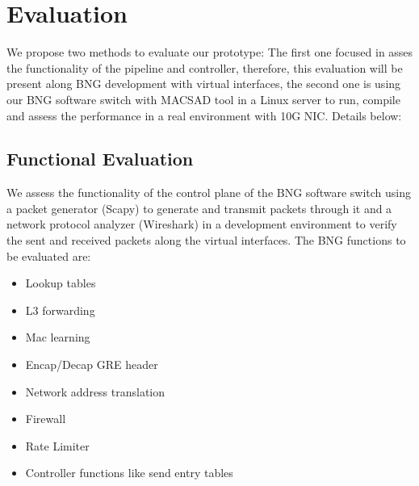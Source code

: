 \chapter{Evaluation}
\label{cap:cap05}


We propose two methods to evaluate our prototype: The first one focused in asses the functionality of the pipeline and controller, therefore, this evaluation will be present along BNG development with virtual interfaces, the second one is using our BNG software switch with MACSAD tool in a Linux server to run, compile and assess the performance in a real environment with 10G NIC. Details below:

\section{Functional Evaluation}
We assess the functionality of the control plane of the BNG software switch using a packet generator (Scapy) to generate and transmit packets through it and a network protocol analyzer (Wireshark) in a development environment to verify the sent and received packets along the virtual interfaces. The BNG functions to be evaluated are: 

\begin{itemize}
	\item Lookup tables
	\item L3 forwarding
	\item Mac learning
	\item Encap/Decap GRE header
	\item Network address translation
	\item Firewall
	\item Rate Limiter 
	\item Controller functions like send entry tables
\end{itemize}


